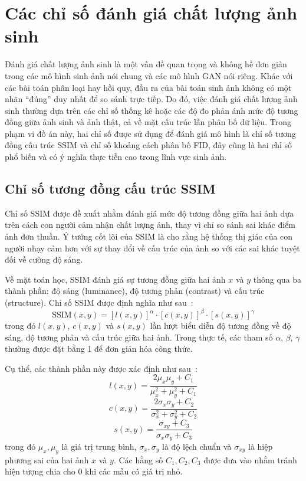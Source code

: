 \documentclass[../DoAn.tex]{subfiles}
\begin{document}
\section{Các chỉ số đánh giá chất lượng ảnh sinh}
\label{section:2.5}

Đánh giá chất lượng ảnh sinh là một vấn đề quan trọng và không hề đơn giản trong các mô hình sinh ảnh nói chung và các mô hình GAN nói riêng. Khác với các bài toán phân loại hay hồi quy, đầu ra của bài toán sinh ảnh không có một nhãn “đúng” duy nhất để so sánh trực tiếp. Do đó, việc đánh giá chất lượng ảnh sinh thường dựa trên các chỉ số thống kê hoặc các độ đo phản ánh mức độ tương đồng giữa ảnh sinh và ảnh thật, cả về mặt cấu trúc lẫn phân bố dữ liệu. Trong phạm vi đồ án này, hai chỉ số được sử dụng để đánh giá mô hình là chỉ số tương đồng cấu trúc SSIM và chỉ số khoảng cách phân bố FID, đây cũng là hai chỉ số phổ biến và có ý nghĩa thực tiễn cao trong lĩnh vực sinh ảnh.

\subsection{Chỉ số tương đồng cấu trúc SSIM}

Chỉ số SSIM được đề xuất nhằm đánh giá mức độ tương đồng giữa hai ảnh dựa trên cách con người cảm nhận chất lượng ảnh, thay vì chỉ so sánh sai khác điểm ảnh đơn thuần. Ý tưởng cốt lõi của SSIM là cho rằng hệ thống thị giác của con người nhạy cảm hơn với sự thay đổi về cấu trúc của ảnh so với các sai khác tuyệt đối về cường độ sáng.

Về mặt toán học, SSIM đánh giá sự tương đồng giữa hai ảnh $x$ và $y$ thông qua ba thành phần: độ sáng (luminance), độ tương phản (contrast) và cấu trúc (structure). Chỉ số SSIM được định nghĩa như sau~\cite{wang2004ssim}:
\[
\text{SSIM}(x, y) = [l(x,y)]^\alpha \cdot [c(x,y)]^\beta \cdot [s(x,y)]^\gamma
\]
trong đó $l(x,y)$, $c(x,y)$ và $s(x,y)$ lần lượt biểu diễn độ tương đồng về độ sáng, độ tương phản và cấu trúc giữa hai ảnh. Trong thực tế, các tham số $\alpha$, $\beta$, $\gamma$ thường được đặt bằng 1 để đơn giản hóa công thức.

Cụ thể, các thành phần này được xác định như sau~\cite{wang2004ssim}:
\[
l(x,y) = \frac{2\mu_x \mu_y + C_1}{\mu_x^2 + \mu_y^2 + C_1}
\]
\[
c(x,y) = \frac{2\sigma_x \sigma_y + C_2}{\sigma_x^2 + \sigma_y^2 + C_2}
\]
\[
s(x,y) = \frac{\sigma_{xy} + C_3}{\sigma_x \sigma_y + C_3}
\]
trong đó $\mu_x, \mu_y$ là giá trị trung bình, $\sigma_x, \sigma_y$ là độ lệch chuẩn và $\sigma_{xy}$ là hiệp phương sai của hai ảnh $x$ và $y$. Các hằng số $C_1, C_2, C_3$ được đưa vào nhằm tránh hiện tượng chia cho 0 khi các mẫu có giá trị nhỏ.
\end{document}
